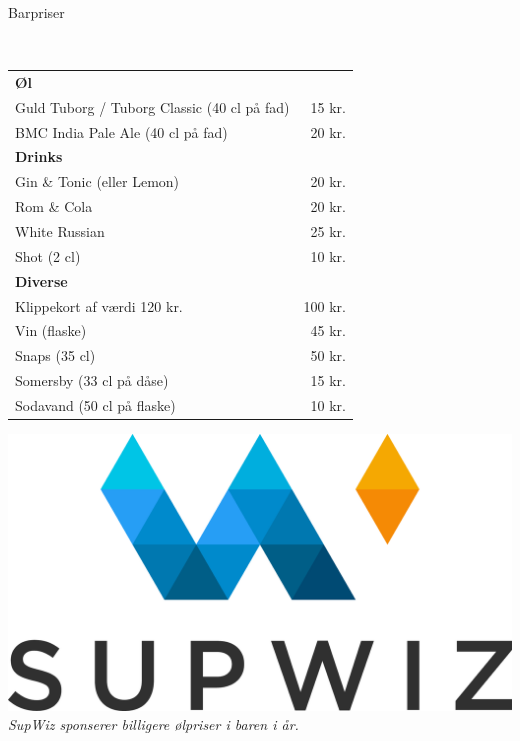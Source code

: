 \begin{flushleft}
\begin{huge}
Barpriser
\end{huge}
\\[.1cm]
\begin{table}[h!]
\begin{tabular}{lr}
\textbf{Øl} & \\
Guld Tuborg / Tuborg Classic (40 cl på fad) & 15 kr.\\
BMC India Pale Ale (40 cl på fad) & 20 kr.\\[2ex]
\textbf{Drinks} & \\
Gin \& Tonic (eller Lemon) & 20 kr.\\
Rom \& Cola & 20 kr.\\
White Russian & 25 kr.\\
Shot (2 cl) & 10 kr.\\[2ex]
\textbf{Diverse} & \\
Klippekort af værdi 120 kr. & 100 kr.\\
Vin (flaske) & 45 kr.\\
Snaps (35 cl) & 50 kr.\\
Somersby (33 cl på dåse) & 15 kr. \\
Sodavand (50 cl på flaske) & 10 kr.\\
\end{tabular}
\end{table}
\end{flushleft}
\vfill
\begin{center}
\includegraphics[width=.9\linewidth]{supwiz.pdf}
\\[2mm]\emph{SupWiz sponserer billigere ølpriser i baren i år.}
\end{center}
